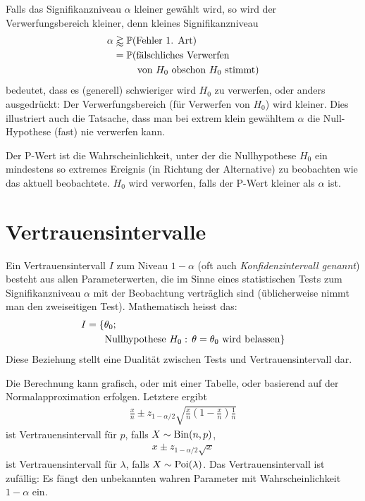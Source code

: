 Falls das Signifikanzniveau $\alpha$ kleiner gewählt wird, so wird der Verwerfungsbereich kleiner, denn kleines Signifikanzniveau
\begin{align*}
	\alpha&\gtrapprox \p(\text{Fehler 1. Art})\\
	&=\p(\text{fälschliches Verwerfen} \\
	&\hphantom{=\p()} \text{von $H_0$ obschon $H_0$ stimmt})
\end{align*}
bedeutet, dass es (generell) schwieriger wird $H_0$ zu verwerfen, oder anders ausgedrückt: Der Verwerfungsbereich (für Verwerfen von $H_0$) wird kleiner. Dies illustriert auch die Tatsache, dass man bei extrem klein gewähltem $\alpha$ die Null-Hypothese (fast) nie verwerfen kann.

Der P-Wert ist die Wahrscheinlichkeit, unter der die Nullhypothese $H_0$ ein mindestens so extremes Ereignis (in Richtung der Alternative) zu beobachten wie das aktuell beobachtete. $H_0$ wird verworfen, falls der P-Wert kleiner als $\alpha$ ist.
\section{Vertrauensintervalle}
Ein Vertrauensintervall $I$ zum Niveau $1-\alpha$ (oft auch \emph{Konfidenzintervall genannt}) besteht aus allen Parameterwerten, die im Sinne eines statistischen Tests zum Signifikanzniveau $\alpha$ mit der Beobachtung verträglich sind (üblicherweise nimmt man den zweiseitigen Test). Mathematisch heisst das:
\begin{align*}
	I&=\{ \theta_0;\\
		&\hphantom{=\{}\text{ Nullhypothese }H_0:\, \theta=\theta_0\text{ wird belassen} \}
\end{align*}
Diese Beziehung stellt eine Dualität zwischen Tests und Vertrauensintervall dar. 

Die Berechnung kann grafisch, oder mit einer Tabelle, oder basierend auf der Normalapproximation erfolgen. Letztere ergibt
\begin{gather*}
	\frac{x}{n}\pm z_{1-\alpha/2}\sqrt{\frac{x}{n}\left( 1-\frac{x}{n} \right)\frac{1}{n}}
\end{gather*}
ist Vertrauensintervall für $p$, falls $X\sim \operatorname{Bin}(n,p)$,
\begin{gather*}
	x\pm z_{1-\alpha/2}\sqrt{x}
\end{gather*}
ist Vertrauensintervall für $\lambda$, falls $X\sim \operatorname{Poi}(\lambda)$.
Das Vertrauensintervall ist zufällig: Es fängt den unbekannten wahren Parameter mit Wahrscheinlichkeit $1-\alpha$ ein.
